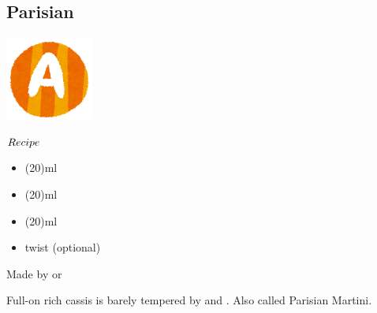 \subsection{Parisian}
\vspace{-7mm}
\hspace{28mm}
\includegraphics[scale=.12]{capital_a.png}
\vspace{2.5mm}
\begin{itembox}[l]{\boldmath $Recipe$}
\begin{itemize}
\setlength{\parskip}{0cm}
\setlength{\itemsep}{0cm}
\item {}(20)ml
\item {}(20)ml
\item {}(20)ml
\item \lemon twist (optional)
\end{itemize}
\vspace{-4mm}
Made by \shake or \stir
\end{itembox}
Full-on rich cassis is barely tempered by \gin and \vermouth
\hspace{-1mm}.
Also called Parisian Martini.
